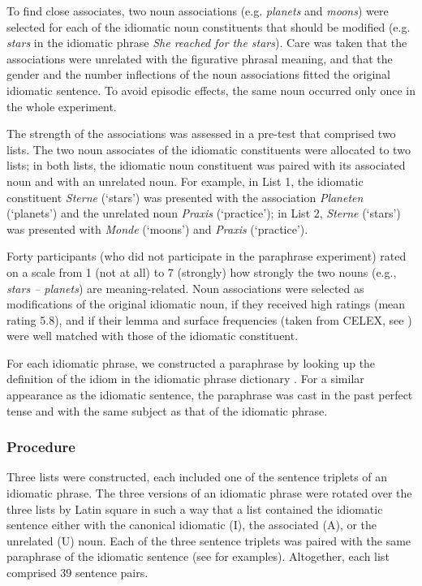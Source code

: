 \documentclass[output=paper]{langsci/langscibook}
\begin{document}
To find close associates, two noun associations (e.g. \textit{planets} and \textit{moons}) were selected for each of the idiomatic noun constituents that should be modified (e.g. \textit{stars} in the idiomatic phrase \textit{She reached for the stars}). Care was taken that the associations were unrelated with the figurative phrasal meaning, and that the gender and the number inflections of the noun associations fitted the original idiomatic sentence. To avoid episodic effects, the same noun occurred only once in the whole experiment.

The strength of the associations was assessed in a pre-test that comprised two lists. The two noun associates of the idiomatic constituents were allocated to two lists; in both lists, the idiomatic noun constituent was paired with its associated noun and with an unrelated noun.  For example, in List 1, the idiomatic constituent \textit{Sterne} (‘stars’) was presented with the association \textit{Planeten} (‘planets’) and the unrelated noun \textit{Praxis} (‘practice’); in List 2, \textit{Sterne} (‘stars’) was presented with \textit{Monde} (‘moons’) and \textit{Praxis} (‘practice’).

\hspace*{-0.11336pt}Forty participants (who did not participate in the paraphrase experiment) rated on a scale from 1 (not at all) to 7 (strongly) how strongly the two nouns (e.g., \textit{stars – planets}) are meaning-related. Noun associations were selected as modifications of the original idiomatic noun, if they received high ratings (mean rating 5.8), and if their lemma and surface frequencies (taken from CELEX, see \citealt{baayen:1993}) were well matched with those of the idiomatic constituent. 

For each idiomatic phrase, we constructed a paraphrase by looking up the definition of the idiom in the idiomatic phrase dictionary \citep{redewendungen:2002}. For a similar appearance as the idiomatic sentence, the paraphrase was cast in the past perfect tense and with the same subject as that of the idiomatic phrase. 

\subsubsection{Procedure}
Three lists were constructed, each included one of the sentence triplets of an idiomatic phrase.  The three versions of an idiomatic phrase were rotated over the three lists by Latin square in such a way that a list contained the idiomatic sentence either with the canonical idiomatic (I), the associated (A), or the unrelated (U) noun. Each of the three sentence triplets was paired with the same paraphrase of the idiomatic sentence (see  for examples). Altogether, each list comprised 39 sentence pairs. 
\end{document}
